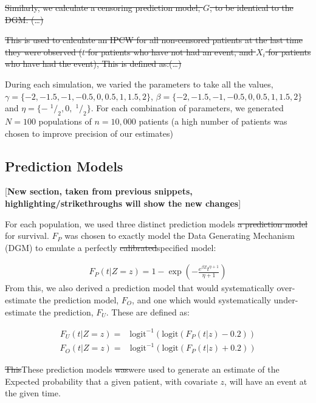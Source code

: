 \documentclass[12pt,PhD,twoside,openright]{muthesis}
\newcommand{\txt}[1]{\textrm{#1}}
\def\logit{\txt{logit}}
\newcommand{\sfrac}[2]{\;^{#1}/_{#2}}
\begin{document}
\sout{Similarly, we calculate a censoring prediction model, \(G\), to be identical to the DGM: (\ldots)}

\sout{This is used to calculate an IPCW for all non-censored patients at the last time they were observed (\(t\) for patients who have not had an event, and \(X_i\) for patients who have had the event), This is defined as:(\ldots)}

During each simulation, we varied the parameters to take all the values,\(\gamma = \{-2,-1.5,-1,-0.5,0,0.5,1,1.5,2\}\), \(\beta = \{-2,-1.5,-1,-0.5,0,0.5,1,1.5,2\}\) and \(\eta = \{-\sfrac{1}{2},0,\sfrac{1}{2}\}\). For each combination of parameters, we generated \(N = 100\) populations of \(n = 10,000\) patients (a high number of patients was chosen to improve precision of our estimates)

\hypertarget{prediction-models}{%
\subsection{Prediction Models}\label{prediction-models}}

{[}\textbf{New section, taken from previous snippets, highlighting/strikethroughs will show the new changes}{]}

For each population, we used three distinct prediction models \sout{a prediction model} for survival. \(F_P\) was chosen to exactly model the Data Generating Mechanism (DGM) to emulate a perfectly \sout{calibrated}specified model:

\[
\begin{array}{c}
F_P(t|Z = z) = 1 - \exp\left(-\frac{e^{\beta Z}t^{\eta+1}}{\eta+1}\right)
\end{array}
\]
From this, we also derived a prediction model that would systematically over-estimate the prediction model, \(F_O\), and one which would systematically under-estimate the prediction, \(F_U\). These are defined as:

\[
\begin{array}{rl}
F_U(t|Z=z) =& \logit^{-1}\left(\logit\left( F_P(t|z) - 0.2\right)\right)
\end{array}
\]
\[
\begin{array}{rl}
F_O(t|Z=z) =& \logit^{-1}\left(\logit\left( F_P(t|z) + 0.2\right)\right)
\end{array}
\]

\sout{This}These prediction models \sout{was}were used to generate an estimate of the Expected probability that a given patient, with covariate \(z\), will have an event at the given time.
\end{document}
